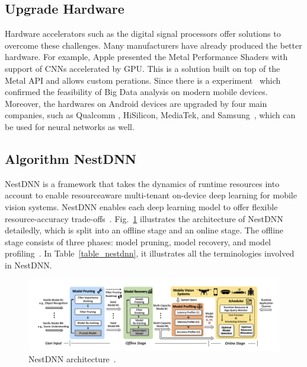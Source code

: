 \documentclass[UTF8]{article}
\begin{document}
\subsection{Upgrade Hardware}\label{upgrade_hardware}
Hardware accelerators such as the digital signal processors offer solutions to overcome these challenges. Many manufacturers have already produced the better hardware. For example, Apple presented the Metal Performance Shaders with support of CNNs accelerated by GPU. This is a solution built on top of the Metal API and allows custom perations. Since there is a experiment~\cite{akusok2019metal} which confirmed the feasibility of Big Data analysis on modern mobile devices. Moreover, the hardwares on Android devices are upgraded by four main companies, such as Qualcomm , HiSilicon, MediaTek, and Samsung~\cite{Andrey2019Aibenchmark}, which can be used for neural networks as well.

\subsection{Algorithm NestDNN}\label{nestdnn}
NestDNN is a framework that takes the dynamics of runtime resources into account to enable resourceaware multi-tenant on-device deep learning for mobile vision systems. NestDNN enables each deep learning model to offer flexible resource-accuracy trade-offs~\cite{fang2018nestdnn}. Fig.~\ref{nestdnn_arch} illustrates the architecture of NestDNN detailedly, which is split into an offline stage and an online stage. The offline stage consists of three phases: model pruning, model recovery, and model profiling~\cite{fang2018nestdnn}. In Table~\ref{table_nestdnn}, it illustrates all the terminologies involved in NestDNN.

	\begin{figure}[htbp]
	\centering
	\includegraphics[width=1\linewidth]{figure/nestdnn_architecture.png}
	\caption{NestDNN architecture~\cite{fang2018nestdnn}.}
	\label{nestdnn_arch}
\end{figure}
\end{document}
